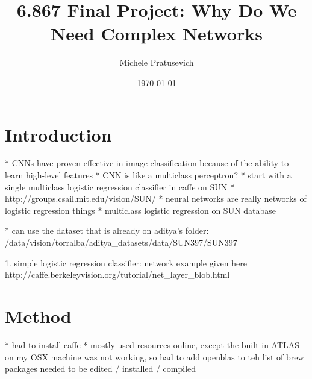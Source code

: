 \documentclass[10pt]{article}
\begin{document}
\title{6.867 Final Project: Why Do We Need Complex Networks}
\author{Michele Pratusevich}
\date{\today}
\maketitle

\section{Introduction}

* CNNs have proven effective in image classification because of the ability to learn high-level features
* CNN is like a multiclass perceptron?
	* start with a single multiclass logistic regression classifier in caffe on SUN
* http://groups.csail.mit.edu/vision/SUN/
* neural networks are really networks of logistic regression things
* multiclass logistic regression on SUN database

* can use the dataset that is already on aditya's folder: 
/data/vision/torralba/aditya_datasets/data/SUN397/SUN397

1. simple logistic regression classifier: network example given here http://caffe.berkeleyvision.org/tutorial/net_layer_blob.html

\section{Method}

* had to install caffe
* mostly used resources online, except the built-in ATLAS on my OSX machine was not working, so had to add openblas to teh list of brew packages needed to be edited / installed / compiled
\end{document}
